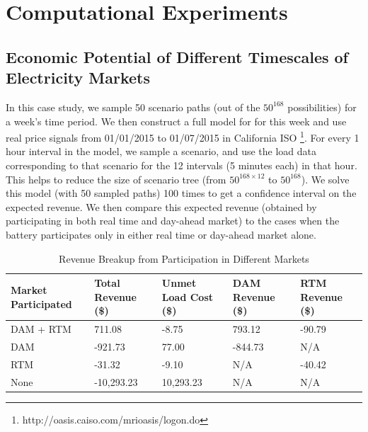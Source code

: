 \documentclass[11pt,twoside]{article}
\begin{document}
\section{Computational Experiments}\label{sec:exp}

\subsection{Economic Potential of Different Timescales of Electricity Markets}
In this case study, we sample 50 scenario paths (out of the $50^{168}$ possibilities) for a week's time period. We then construct a full model for for this week and use real price signals from 01/01/2015 to 01/07/2015 in California ISO \footnote{http://oasis.caiso.com/mrioasis/logon.do}. For every 1 hour interval in the model, we sample a scenario, and use the load data corresponding to that scenario for the 12 intervals (5 minutes each) in that hour. This helps to reduce the size of scenario tree (from $50^{168 \times 12}$ to $50^{168}$). We solve this model (with 50 sampled paths) 100 times to get a confidence interval on the expected revenue. We then compare this expected revenue (obtained by participating in both real time and day-ahead market) to the cases when the battery participates only in either real time or day-ahead market alone.
\begin{table}[!ht]\centering
\caption{Revenue Breakup from Participation in Different Markets}
\begin{tabular}{|C{3cm}|C{2.5cm}|C{3.5cm}|C{3cm}|C{2.5cm}|} 
\hline 
Market Participated  & Total Revenue (\$) & Unmet Load Cost (\$) & DAM Revenue  (\$) & RTM Revenue (\$) \\
\hline 
DAM + RTM & 711.08 & -8.75 & 793.12 & -90.79 \\ 
\hline 
DAM & -921.73 & 77.00 & -844.73 & N/A \\ 
\hline 
RTM & -31.32 & -9.10 & N/A & -40.42 \\ 
\hline 
None & -10,293.23 & 10,293.23 & N/A & N/A \\ 
\hline 
\end{tabular} \label{tab:rev_comp} 
\end{table}
\end{document}
